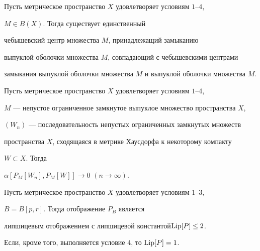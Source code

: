 \begin{lem}


Пусть метрическое пространство $X$ удовлетворяет условиям $1$--$4$,


$M \in B(X)$. Тогда существует единственный 


чебышевский центр множества $M$, принадлежащий замыканию 


выпуклой оболочки множества $M$, совпадающий с чебышевскими центрами


замыкания выпуклой оболочки множества $M$ и выпуклой оболочки множества $M$.


\end{lem}





\begin{lem}


Пусть метрическое пространство $X$ удовлетворяет условиям $1$--$4$,


$M$ --- непустое ограниченное замкнутое выпуклое множество пространства $X$,


$(W_{n})$ --- последовательность непустых ограниченных замкнутых множеств 


пространства $X$, сходящаяся в метрике Хаусдорфа к некоторому компакту 


$W \subset X$. Тогда 


$\alpha [P_{M}[W_{n}],P_{M}[W]] \rightarrow 0$ $(n \rightarrow \infty)$.


\end{lem}





\begin{lem}


Пусть метрическое пространство $X$ удовлетворяет условиям $1$--$3$,


$B = B[p,r]$. Тогда отображение $P_{B}$ является 


липшицевым отображением с липшицевой константой\linebreak $\operatorname{Lip}[P] \leq 2$. 


Если, кроме того, выполняется условие $4$, то $\operatorname{Lip}[P] = 1$.


\end{lem}






